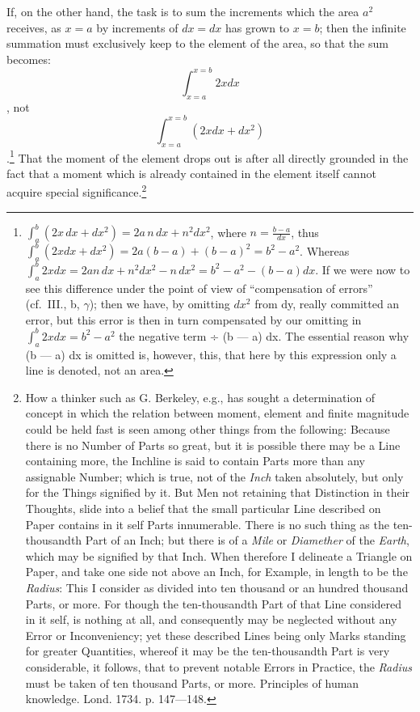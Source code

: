 \documentclass[12pt,a4paper,openany]{book}
\newcommand{\opage}[1]{\marginnote{\footnotesize\textit{[#1]}}}
\begin{document}
If, on the other hand, the task is to sum the increments which the area
$a^{2}$ receives, as $x=a$ by increments of $dx=dx$ has grown
to $x=b$; then the infinite summation must exclusively
keep to the element of the area, so that the sum becomes:
\[ \int_{x=a}^{x=b}2xdx \]
, not
\[ \int_{x=a}^{x=b}(2xdx+dx^{2}) \]
.\footnote[1]{$\int_{a}^{b}(2x\,dx+dx^{2})=2a\,n\,dx+n^{2}dx^{2}$, where $n=\frac{b-a}{dx}$, thus $\int_{a}^{b}(2xdx+dx^{2})=2a(b-a)+(b-a)^{2}=b^{2}-a^{2}$. Whereas $\int_{a}^{b}2xdx=2a n\,dx+n^{2}dx^{2}-n\,dx^{2}=b^{2}-a^{2}-(b-a)dx$. If we were now to see this difference under the point of view of ``compensation of errors'' (cf.\ III., b, $\gamma$); then we have, by omitting $dx^{2}$ from dy, really committed an error, but this error is then in turn compensated by our omitting in $\int_{a}^{b}2xdx=b^{2}-a^{2}$ the negative term ÷ (b — a) dx. The essential reason why (b — a) dx is omitted is, however, this, that here by this expression only a line is denoted, not an area.} That the moment of the element
\setcounter{footnote}{0}%
\opage{107}drops out is after all directly grounded in the fact that a moment
which is already contained in the element itself cannot acquire
special significance.\footnote[1]{How a thinker such as G. Berkeley, e.g., has sought a determination of concept in which the relation between moment, element and finite magnitude could be held fast is seen among other things from the following: Because there is no Number of Parts so great, but it is possible there may be a Line containing more, the Inchline is said to contain Parts more than any assignable Number; which is true, not of the \emph{Inch} taken absolutely, but only for the Things signified by it. But Men not retaining that Distinction in their Thoughts, slide into a belief that the small particular Line described on Paper contains in it self Parts innumerable. There is no such thing as the ten-thousandth Part of an Inch; but there is of a \emph{Mile} or \emph{Diamether} of the \emph{Earth}, which may be signified by that Inch. When therefore I delineate a Triangle on Paper, and take one side not above an Inch, for Example, in length to be the \emph{Radius}: This I consider as divided into ten thousand or an hundred thousand Parts, or more. For though the ten-thousandth Part of that Line considered in it self, is nothing at all, and consequently may be neglected without any Error or Inconveniency; yet these described Lines being only Marks standing for greater Quantities, whereof it may be the ten-thousandth Part is very considerable, it follows, that to prevent notable Errors in Practice, the \emph{Radius} must be taken of ten thousand Parts, or more. Principles of human knowledge. Lond. 1734. p. 147—148.}
\end{document}
